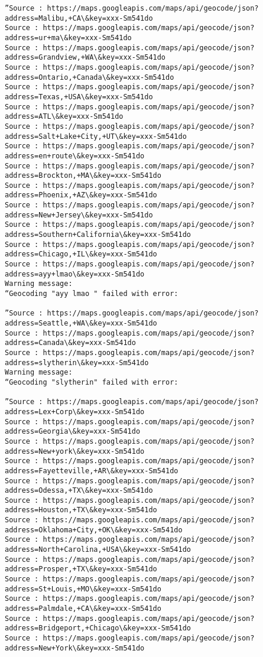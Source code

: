 \documentclass[11pt]{article}
\begin{document}
\begin{Verbatim}[commandchars=\\\{\}]
”Source : https://maps.googleapis.com/maps/api/geocode/json?address=Malibu,+CA\&key=xxx-Sm541do
Source : https://maps.googleapis.com/maps/api/geocode/json?address=ur+ma\&key=xxx-Sm541do
Source : https://maps.googleapis.com/maps/api/geocode/json?address=Grandview,+WA\&key=xxx-Sm541do
Source : https://maps.googleapis.com/maps/api/geocode/json?address=Ontario,+Canada\&key=xxx-Sm541do
Source : https://maps.googleapis.com/maps/api/geocode/json?address=Texas,+USA\&key=xxx-Sm541do
Source : https://maps.googleapis.com/maps/api/geocode/json?address=ATL\&key=xxx-Sm541do
Source : https://maps.googleapis.com/maps/api/geocode/json?address=Salt+Lake+City,+UT\&key=xxx-Sm541do
Source : https://maps.googleapis.com/maps/api/geocode/json?address=en+route\&key=xxx-Sm541do
Source : https://maps.googleapis.com/maps/api/geocode/json?address=Brockton,+MA\&key=xxx-Sm541do
Source : https://maps.googleapis.com/maps/api/geocode/json?address=Phoenix,+AZ\&key=xxx-Sm541do
Source : https://maps.googleapis.com/maps/api/geocode/json?address=New+Jersey\&key=xxx-Sm541do
Source : https://maps.googleapis.com/maps/api/geocode/json?address=Southern+California\&key=xxx-Sm541do
Source : https://maps.googleapis.com/maps/api/geocode/json?address=Chicago,+IL\&key=xxx-Sm541do
Source : https://maps.googleapis.com/maps/api/geocode/json?address=ayy+lmao\&key=xxx-Sm541do
Warning message:
“Geocoding "ayy lmao " failed with error:

”Source : https://maps.googleapis.com/maps/api/geocode/json?address=Seattle,+WA\&key=xxx-Sm541do
Source : https://maps.googleapis.com/maps/api/geocode/json?address=Canada\&key=xxx-Sm541do
Source : https://maps.googleapis.com/maps/api/geocode/json?address=slytherin\&key=xxx-Sm541do
Warning message:
“Geocoding "slytherin" failed with error:

”Source : https://maps.googleapis.com/maps/api/geocode/json?address=Lex+Corp\&key=xxx-Sm541do
Source : https://maps.googleapis.com/maps/api/geocode/json?address=Georgia\&key=xxx-Sm541do
Source : https://maps.googleapis.com/maps/api/geocode/json?address=New+york\&key=xxx-Sm541do
Source : https://maps.googleapis.com/maps/api/geocode/json?address=Fayetteville,+AR\&key=xxx-Sm541do
Source : https://maps.googleapis.com/maps/api/geocode/json?address=Odessa,+TX\&key=xxx-Sm541do
Source : https://maps.googleapis.com/maps/api/geocode/json?address=Houston,+TX\&key=xxx-Sm541do
Source : https://maps.googleapis.com/maps/api/geocode/json?address=Oklahoma+City,+OK\&key=xxx-Sm541do
Source : https://maps.googleapis.com/maps/api/geocode/json?address=North+Carolina,+USA\&key=xxx-Sm541do
Source : https://maps.googleapis.com/maps/api/geocode/json?address=Prosper,+TX\&key=xxx-Sm541do
Source : https://maps.googleapis.com/maps/api/geocode/json?address=St+Louis,+MO\&key=xxx-Sm541do
Source : https://maps.googleapis.com/maps/api/geocode/json?address=Palmdale,+CA\&key=xxx-Sm541do
Source : https://maps.googleapis.com/maps/api/geocode/json?address=Bridgeport,+Chicago\&key=xxx-Sm541do
Source : https://maps.googleapis.com/maps/api/geocode/json?address=New+York\&key=xxx-Sm541do

    \end{Verbatim}
\end{document}
